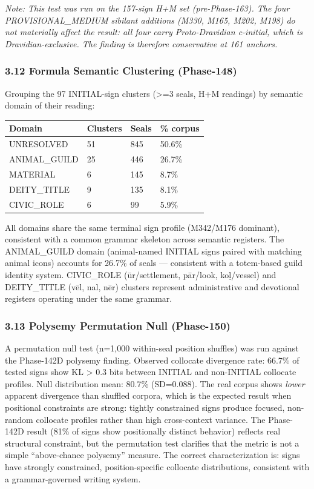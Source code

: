 \documentclass[
]{article}
\newcounter{none} %
\begin{document}
\emph{Note: This test was run on the 157-sign H+M set (pre-Phase-163). The four PROVISIONAL\_MEDIUM sibilant additions (M330, M165, M202, M198) do not materially affect the result: all four carry Proto-Dravidian \emph{c}-initial, which is Dravidian-exclusive. The finding is therefore conservative at 161 anchors.}

\subsubsection{3.12 Formula Semantic Clustering
(Phase-148)}\label{formula-semantic-clustering-phase-148}

Grouping the 97 INITIAL-sign clusters (\textgreater{}=3 seals, H+M readings) by
semantic domain of their reading:

{\def\LTcaptype{none} %
\begin{longtable}[]{@{}llll@{}}
\toprule\noalign{}
Domain & Clusters & Seals & \% corpus \\
\midrule\noalign{}
\endhead
\bottomrule\noalign{}
\endlastfoot
UNRESOLVED & 51 & 845 & 50.6\% \\
ANIMAL\_GUILD & 25 & 446 & 26.7\% \\
MATERIAL & 6 & 145 & 8.7\% \\
DEITY\_TITLE & 9 & 135 & 8.1\% \\
CIVIC\_ROLE & 6 & 99 & 5.9\% \\
\end{longtable}
}

All domains share the same terminal sign profile (M342/M176 dominant),
consistent with a common grammar skeleton across semantic registers. The
ANIMAL\_GUILD domain (animal-named INITIAL signs paired with matching
animal icons) accounts for 26.7\% of seals --- consistent with a
totem-based guild identity system. CIVIC\_ROLE (ūr/settlement, pār/look,
koḷ/vessel) and DEITY\_TITLE (vēl, nal, nēr) clusters represent
administrative and devotional registers operating under the same
grammar.

\subsubsection{3.13 Polysemy Permutation Null
(Phase-150)}\label{polysemy-permutation-null-phase-150}

A permutation null test (n=1,000 within-seal position shuffles) was run
against the Phase-142D polysemy finding. Observed collocate divergence
rate: 66.7\% of tested signs show KL \textgreater{} 0.3 bits between
INITIAL and non-INITIAL collocate profiles. Null distribution mean:
80.7\% (SD=0.088). The real corpus shows \emph{lower} apparent
divergence than shuffled corpora, which is the expected result when
positional constraints are strong: tightly constrained signs produce
focused, non-random collocate profiles rather than high cross-context
variance. The Phase-142D result (81\% of signs show positionally
distinct behavior) reflects real structural constraint, but the
permutation test clarifies that the metric is not a simple
``above-chance polysemy'' measure. The correct characterization is:
signs have strongly constrained, position-specific collocate
distributions, consistent with a grammar-governed writing system.
\end{document}
